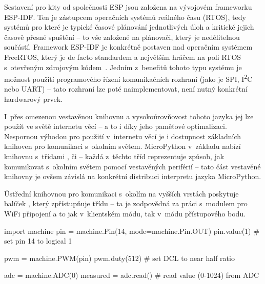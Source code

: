 Sestavení pro kity od společnosti ESP jsou založena na vývojovém frameworku ESP-IDF.
Ten je zástupcem operačních systémů reálného času (RTOS), tedy systémů pro které je typické časové plánování
jednotlivých úloh a kritické jejich časově přesné spuštění -- to vše založené na plánovači, který je
nedělitelnou součástí.
Framework ESP-IDF je konkrétně postaven nad operačním systémem FreeRTOS, který je de facto standardem a největším hráčem
na poli RTOS s~otevřeným zdrojovým kódem~\cite{RTOSSelection}.
Jedním z~benefitů tohoto typu systému je možnost použití programového řízení komunikačních rozhraní
(jako je SPI, I\textsuperscript{2}C nebo UART) -- tato rozhraní lze poté naimplementovat, není nutný konkrétní
hardwarový prvek.

I~přes omezenou vestavěnou knihovnu a vysokoúrovňovost tohoto jazyka jej lze použít ve světě internetu věcí --
a to i díky jeho paměťové optimalizaci.
Nespornou výhodou pro použití v~internetu věcí je i dostupnost základních knihoven pro komunikaci s~okolním světem.
MicroPython v~základu nabízí knihovnu  s~třídami ,  či  --
každá z~těchto tříd reprezentuje způsob, jak komunikovat s~okolním světem pomocí vestavěných periférií
-- tato část vestavěné knihovny je ovšem závislá na konkrétní distribuci interpretu jazyka MicroPython.

Ústřední knihovnou pro komunikaci s~okolím na vyšších vrstách poskytuje balíček , který zpřístupňuje
třídu  -- ta je zodpovědná za práci s~modulem pro WiFi připojení a to jak v~klientském módu, tak v~módu
přístupového bodu.

\begin{code}[language=Python,caption={Ukázka práce s~periferiemi čipu pomocí vestavěných knihoven jazyka MicroPython
-- v~první části se jedná o~nastavení pinu na logickou hodnotu 1, prostřední část patří nastavení pulzně šířkové
modulace (PWM) na pinu čipu a konec je ve znamení čtení z~prvního kanálu analogově-digitálního převodníku (ADC).}]
import machine
pin = machine.Pin(14, mode=machine.Pin.OUT)
pin.value(1) # set pin 14 to logical 1

pwm = machine.PWM(pin)
pwm.duty(512) # set DCL to near half ratio

adc = machine.ADC(0)
measured = adc.read() # read value (0-1024) from ADC
\end{code}

